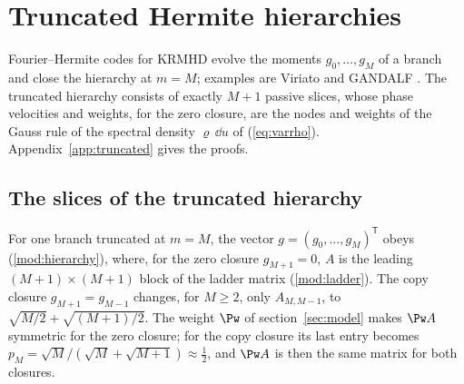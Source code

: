 \section{Truncated Hermite hierarchies}\label{sec:truncated}

Fourier--Hermite codes for KRMHD evolve the moments $g_0,\dots,g_M$ of a branch and close the hierarchy at $m=M$; examples are Viriato \citep{Loureiro2016} and GANDALF \citep{Kanekar2025}. The truncated hierarchy consists of exactly $M+1$ passive slices, whose phase velocities and weights, for the zero closure, are the nodes and weights of the Gauss rule of the spectral density $\varrho\,\dd u$ of (\ref{eq:varrho}). Appendix~\ref{app:truncated} gives the proofs.

\subsection{The slices of the truncated hierarchy}

For one branch truncated at $m=M$, the vector $g=(g_0,\dots,g_M)^{\mathsf T}$ obeys (\ref{mod:hierarchy}), where, for the zero closure $g_{M+1}=0$, $A$ is the leading $(M+1)\times(M+1)$ block of the ladder matrix (\ref{mod:ladder}). The copy closure $g_{M+1}=g_{M-1}$ changes, for $M\ge2$, only $A_{M,M-1}$, to $\sqrt{M/2}+\sqrt{(M+1)/2}$. The weight $\Pw$ of section~\ref{sec:model} makes $\Pw A$ symmetric for the zero closure; for the copy closure its last entry becomes $p_M=\sqrt M/(\sqrt M+\sqrt{M+1})\approx\frac12$, and $\Pw A$ is then the same matrix for both closures.

